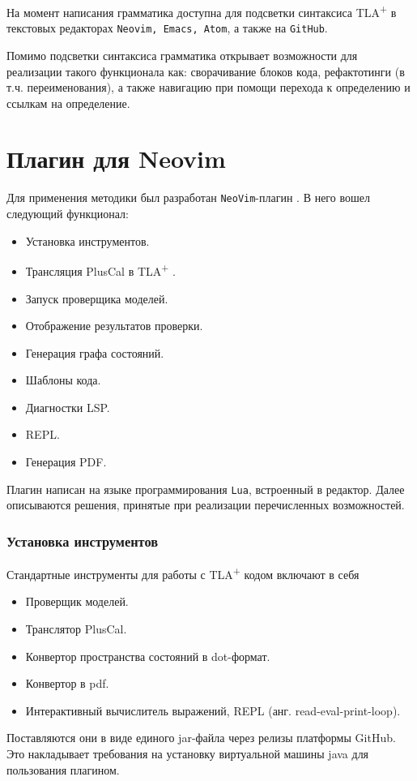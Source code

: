 \documentclass[14pt, openany]{report}
\newcommand{\tlapl}{TLA\textsuperscript{+} }
\begin{document}
На момент написания грамматика доступна для подсветки синтаксиса \tlapl в текстовых редакторах \lstinline[style=progStyle]{Neovim, Emacs, Atom}, а также на \lstinline[style=progStyle]{GitHub}.

Помимо подсветки синтаксиса грамматика открывает возможности для реализации такого функционала как: сворачивание блоков кода, рефактотинги (в т.ч. переименования), а также навигацию при помощи перехода к определению и ссылкам на определение.

\newpage

\section{Плагин для Neovim}

Для применения методики был разработан \lstinline[style=progStyle]{NeoVim}-плагин \cite{tlaNvim}. В него вошел следующий функционал:

\begin{itemize}
  \item Установка инструментов.
  \item Трансляция PlusCal в \tlapl.
  \item Запуск проверщика моделей.
  \item Отображение результатов проверки.
  \item Генерация графа состояний.
  \item Шаблоны кода.
  \item Диагностки LSP.
  \item REPL.
  \item Генерация PDF.
\end{itemize}

Плагин написан на языке программирования \lstinline[style=progStyle]{Lua}, встроенный в редактор. Далее описываются решения, принятые при реализации перечисленных возможностей.

\subsubsection{Установка инструментов}
Стандартные инструменты для работы с \tlapl кодом включают в себя 
\begin{itemize}
  \item Проверщик моделей.
  \item Транслятор PlusCal.
  \item Конвертор пространства состояний в dot-формат.
  \item Конвертор в pdf.
  \item Интерактивный вычислитель выражений, REPL (анг. read-eval-print-loop).
\end{itemize}
Поставляются они в виде единого jar-файла через релизы платформы GitHub. Это накладывает требования на установку виртуальной машины java для пользования плагином. 
\end{document}
